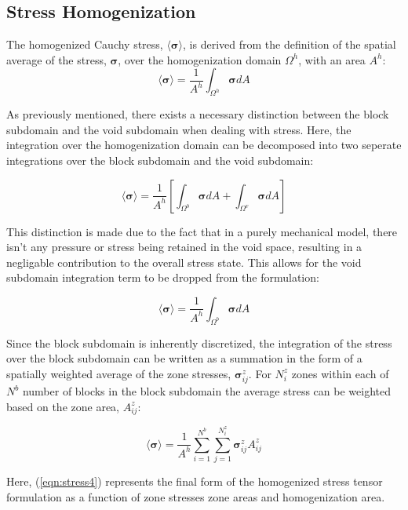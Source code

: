 \subsection{Stress Homogenization}

The homogenized Cauchy stress, $\langle\boldsymbol{\sigma}\rangle$, is derived from the definition of the spatial average of the stress, $\boldsymbol{\sigma}$, over the homogenization domain $\Omega^{h}$, with an area $A^{h}$: 
\begin{equation}
\langle\boldsymbol{\sigma}\rangle=\frac{1}{A^{h}}\int_{\Omega^{h}}\boldsymbol{\sigma}dA\label{eqn:stress1}
\end{equation}


As previously mentioned, there exists a necessary distinction between the block subdomain and the void subdomain when dealing with stress. Here, the integration over the homogenization domain can be decomposed into two seperate integrations over the block subdomain and the void subdomain: 

\begin{equation}
\langle\boldsymbol{\sigma}\rangle=\frac{1}{A^{h}}\left[\int_{\Omega^{b}}\boldsymbol{\sigma}dA+\int_{\Omega^{v}}\boldsymbol{\sigma}dA\right]\label{eqn:stress2}
\end{equation}

This distinction is made due to the fact that in a purely mechanical model, there isn't any pressure or stress being retained in the void space, resulting in a negligable contribution to the overall stress state. This allows for the void subdomain integration term to be dropped from the formulation: 

\begin{equation}
\langle\boldsymbol{\sigma}\rangle=\frac{1}{A^{h}}\int_{\Omega^{b}}\boldsymbol{\sigma}dA\label{eqn:stress2a}
\end{equation}

Since the block subdomain is inherently discretized, the integration of the stress over the block subdomain can be written as a summation in the form of a spatially weighted average of the zone stresses, $\boldsymbol{\sigma}_{ij}^{z}$. For $N_{i}^{z}$ zones within each of $N^{b}$ number of blocks in the block subdomain the average stress can be weighted based on the zone area, $A_{ij}^{z}$: 

\begin{equation}
\langle\boldsymbol{\sigma}\rangle=\frac{1}{A^{h}}\sum_{i=1}^{N^{b}}\sum_{j=1}^{N_{i}^{z}}\boldsymbol{\sigma}_{ij}^{z}A_{ij}^{z}\label{eqn:stress4}
\end{equation}

Here, (\ref{eqn:stress4}) represents the final form of the homogenized stress tensor formulation as a function of zone stresses zone areas and homogenization area.
